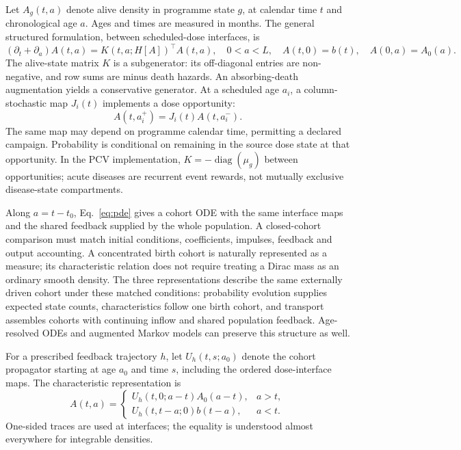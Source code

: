 \documentclass[10pt,letterpaper]{article}
\newcommand{\diag}{\operatorname{diag}}
\begin{document}
Let $A_g(t,a)$ denote alive density in programme state $g$, at calendar time $t$ and chronological age $a$. Ages and times are measured in months. The general structured formulation, between scheduled-dose interfaces, is
\begin{equation}
 (\partial_t+\partial_a)A(t,a)=K(t,a;H[A])^\top A(t,a),
 \quad 0<a<L,\quad A(t,0)=b(t),\quad A(0,a)=A_0(a).
 \label{eq:pde}
\end{equation}
The alive-state matrix $K$ is a subgenerator: its off-diagonal entries are non-negative, and row sums are minus death hazards. An absorbing-death augmentation yields a conservative generator. At a scheduled age $a_i$, a column-stochastic map $J_i(t)$ implements a dose opportunity:
\begin{equation}
 A(t,a_i^+)=J_i(t)A(t,a_i^-).
 \label{eq:jump}
\end{equation}
The same map may depend on programme calendar time, permitting a declared campaign. Probability is conditional on remaining in the source dose state at that opportunity. In the PCV implementation, $K=-\diag(\mu_g)$ between opportunities; acute diseases are recurrent event rewards, not mutually exclusive disease-state compartments.

Along $a=t-t_0$, Eq.~\ref{eq:pde} gives a cohort ODE with the same interface maps and the shared feedback supplied by the whole population. A closed-cohort comparison must match initial conditions, coefficients, impulses, feedback and output accounting. A concentrated birth cohort is naturally represented as a measure; its characteristic relation does not require treating a Dirac mass as an ordinary smooth density. The three representations describe the same externally driven cohort under these matched conditions: probability evolution supplies expected state counts, characteristics follow one birth cohort, and transport assembles cohorts with continuing inflow and shared population feedback. Age-resolved ODEs and augmented Markov models can preserve this structure as well.

For a prescribed feedback trajectory $h$, let $U_h(t,s;a_0)$ denote the cohort propagator starting at age $a_0$ and time $s$, including the ordered dose-interface maps. The characteristic representation is
\begin{equation}
 A(t,a)=\begin{cases}
 U_h(t,0;a-t)A_0(a-t),&a>t,\\
 U_h(t,t-a;0)b(t-a),&a<t.
 \end{cases}
 \label{eq:characteristic_explicit}
\end{equation}
One-sided traces are used at interfaces; the equality is understood almost everywhere for integrable densities.
\end{document}
